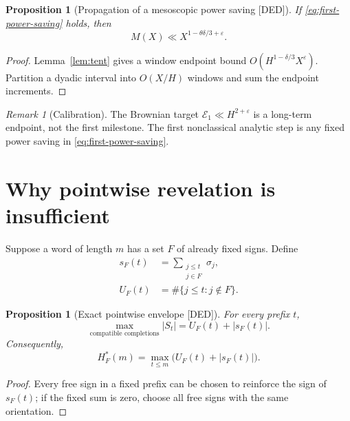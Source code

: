 \documentclass[11pt]{amsart}
\numberwithin{equation}{section}
\theoremstyle{plain}
\newtheorem{proposition}[theorem]{Proposition}
\theoremstyle{definition}
\theoremstyle{remark}
\newtheorem{remark}[theorem]{Remark}
\newcommand{\Mert}{M}
\newcommand{\eps}{\varepsilon}
\newcommand{\DED}{\textup{[DED]}}
\begin{document}
\begin{proposition}[Propagation of a mesoscopic power saving \DED]
\label{prop:power-propagation}
If \eqref{eq:first-power-saving} holds, then
\begin{equation}
\Mert(X)\ll X^{1-\theta\delta/3+\eps}.
\label{eq:power-propagation}
\end{equation}
\end{proposition}

\begin{proof}
Lemma~\ref{lem:tent} gives a window endpoint bound
$O(H^{1-\delta/3}X^\eps)$.  Partition a dyadic interval into $O(X/H)$ windows and sum the
endpoint increments.
\end{proof}

\begin{remark}[Calibration]
\label{rem:energy-calibration}
The Brownian target $\mathcal E_1\ll H^{2+\eps}$ is a long-term endpoint, not the first milestone.
The first nonclassical analytic step is any fixed power saving in \eqref{eq:first-power-saving}.
\end{remark}

\section{Why pointwise revelation is insufficient}
\label{sec:pointwise-no-go}

Suppose a word of length $m$ has a set $F$ of already fixed signs.  Define
\begin{align}
s_F(t)&=\sum_{\substack{j\le t\\j\in F}}\sigma_j,
\label{eq:fixed-prefix-sum}\\
U_F(t)&=\#\{j\le t:j\notin F\}.
\label{eq:unrevealed-count}
\end{align}

\begin{proposition}[Exact pointwise envelope \DED]
\label{prop:pointwise-envelope}
For every prefix $t$,
\begin{equation}
\max_{\text{compatible completions}}|S_t|
=U_F(t)+|s_F(t)|.
\label{eq:pointwise-envelope}
\end{equation}
Consequently,
\begin{equation}
H_F^*(m)
=
\max_{t\le m}\bigl(U_F(t)+|s_F(t)|\bigr).
\label{eq:pointwise-global-envelope}
\end{equation}
\end{proposition}

\begin{proof}
Every free sign in a fixed prefix can be chosen to reinforce the sign of $s_F(t)$; if the fixed sum is
zero, choose all free signs with the same orientation.
\end{proof}
\end{document}
